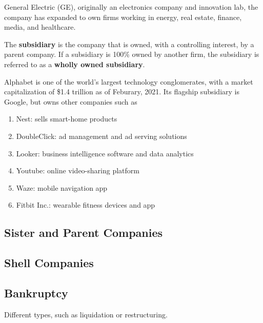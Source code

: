 \documentclass{article}
\begin{document}
    \begin{example}
      General Electric (GE), originally an electronics company and innovation lab, the company has expanded to own firms working in energy, real estate, finance, media, and healthcare. 
    \end{example}

    \begin{definition}[Subsidiary]
      The \textbf{subsidiary} is the company that is owned, with a controlling interest, by a parent company. If a subsidiary is 100\% owned by another firm, the subsidiary is referred to as a \textbf{wholly owned subsidiary}. 
    \end{definition}

    \begin{example}[Alphabet]
      Alphabet is one of the world's largest technology conglomerates, with a market capitalization of \$1.4 trillion as of Feburary, 2021. Its flagship subsidiary is Google, but owns other companies such as
      \begin{enumerate}
        \item Nest: sells smart-home products
        \item DoubleClick: ad management and ad serving solutions
        \item Looker: business intelligence software and data analytics
        \item Youtube: online video-sharing platform
        \item Waze: mobile navigation app
        \item Fitbit Inc.: wearable fitness devices and app
      \end{enumerate}
    \end{example}

  \subsection{Sister and Parent Companies}


  \subsection{Shell Companies}


  \subsection{Bankruptcy}

    Different types, such as liquidation or restructuring. 
\end{document}
